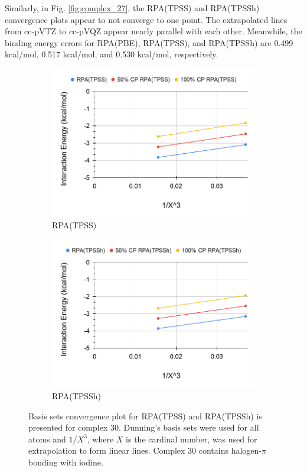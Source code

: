 \documentclass[11pt]{article}
\begin{document}
Similarly, in Fig. \ref{fig:complex_27}, the RPA(TPSS) and RPA(TPSSh)
convergence plots appear to not converge to one point. The extrapolated
lines from cc-pVTZ to cc-pVQZ appear nearly parallel with each other.
Meanwhile, the binding energy errors for RPA(PBE), RPA(TPSS), and
RPA(TPSSh) are 0.499 kcal/mol, 0.517 kcal/mol, and 0.530 kcal/mol,
respectively.

\begin{figure}[hbpt]
  \centering
  \begin{subfigure}{.5\textwidth}
    \centering
    \includegraphics[scale=0.3]{tpss-30.png}
    \caption{RPA(TPSS)}
    \label{fig:tpss_30}
  \end{subfigure}%
  \begin{subfigure}{.5\textwidth}
    \centering
    \includegraphics[scale=0.3]{tpssh-30.png}
    \caption{RPA(TPSSh)}
    \label{fig:tpssh_30}
  \end{subfigure}
  \caption{Basis sets convergence plot for RPA(TPSS) and RPA(TPSSh) is
    presented for complex 30. Dunning's basis sets were used for all
    atoms and $1/X^3$, where $X$ is the cardinal number, was used for
    extrapolation to form linear lines. Complex 30 contains halogen-$\pi$
    bonding with iodine.}
  \label{fig:complex_30}
\end{figure}
\end{document}
